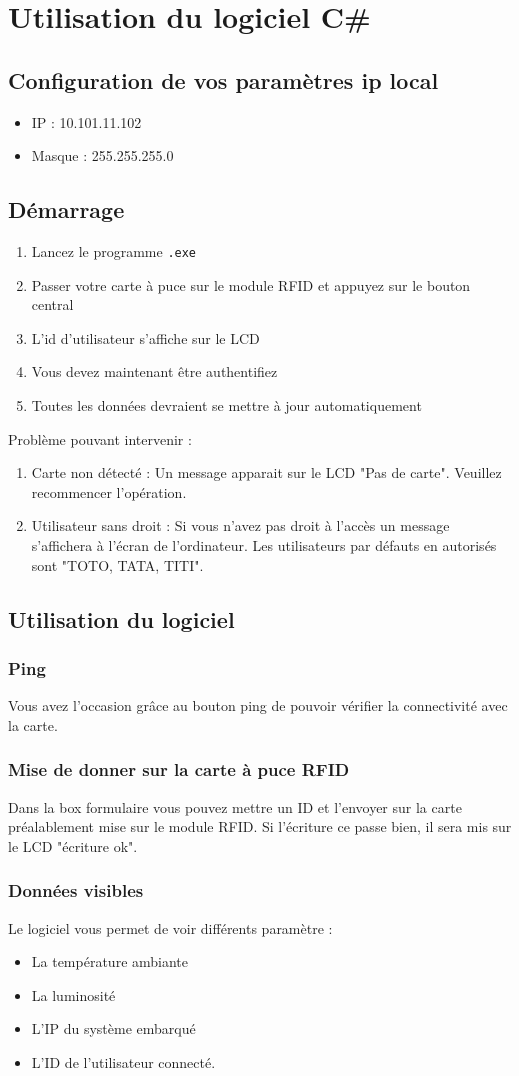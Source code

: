 \documentclass[12pt,a4paper]{report}
\begin{document}
\chapter{Utilisation du logiciel C\#}
	\section{Configuration de vos paramètres ip local}
		\begin{itemize}
			\item IP : 10.101.11.102
			\item Masque : 255.255.255.0
		\end{itemize}
	\section{Démarrage}
		\begin{enumerate}
			\item Lancez le programme \verb+.exe+
			\item Passer votre carte à puce sur le module RFID et appuyez sur le bouton central
			\item L'id d'utilisateur s'affiche sur le LCD 
			\item Vous devez maintenant être authentifiez 
			\item Toutes les données devraient se mettre à jour automatiquement
		\end{enumerate}
		Problème pouvant intervenir : 
		\begin{enumerate}
			\item Carte non détecté : Un message apparait sur le LCD "Pas de carte". Veuillez recommencer l'opération.
			\item Utilisateur sans droit : Si vous n'avez pas droit à l'accès un message s'affichera à l'écran de l'ordinateur. Les utilisateurs par défauts en autorisés sont "TOTO, TATA, TITI".
		\end{enumerate}
		
	\section{Utilisation du logiciel}
		\subsection{Ping}
			Vous avez l'occasion grâce au bouton ping de pouvoir vérifier la connectivité avec la carte. 
		\subsection{Mise de donner sur la carte à puce RFID}
			Dans la box formulaire vous pouvez mettre un ID et l'envoyer sur la carte préalablement mise sur le module RFID. Si l'écriture ce passe bien, il sera mis sur le LCD "écriture ok".
		\subsection{Données visibles}
			Le logiciel vous permet de voir différents paramètre :
			\begin{itemize}
			\item La température ambiante
			\item La luminosité
			\item L'IP du système embarqué
			\item L'ID de l'utilisateur connecté.
			\end{itemize}
			
	
\end{document}
